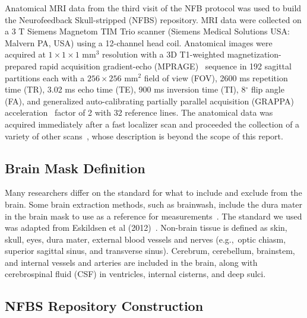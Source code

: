 Anatomical MRI data from the third visit of the NFB protocol was used to build the Neurofeedback Skull-stripped (NFBS) repository. MRI data were collected on a 3 T Siemens Magnetom TIM Trio scanner (Siemens Medical Solutions USA: Malvern PA, USA) using a 12-channel head coil. Anatomical images were acquired at $1\times1\times1$ mm$^3$ resolution with a 3D T1-weighted magnetization-prepared rapid acquisition gradient-echo (MPRAGE)~\cite{Mugler1990} sequence in 192 sagittal partitions each with a $256\times256$ mm$^2$ field of view (FOV), 2600 ms repetition time (TR), 3.02 ms echo time (TE), 900 ms inversion time (TI), 8$^{\circ}$ flip angle (FA), and generalized auto-calibrating partially parallel acquisition (GRAPPA) acceleration~\cite{Griswold2002} factor of 2 with 32 reference lines. The anatomical data was acquired immediately after a fast localizer scan and proceeded the collection of a variety of other scans~\cite{nki_mrproto}, whose description is beyond the scope of this report.

\subsection*{Brain Mask Definition}

\par Many researchers differ on the standard for what to include and exclude from the brain. Some brain extraction methods, such as brainwash, include the dura mater in the brain mask to use as a reference for measurements~\cite{Brainwash}. The standard we used was adapted from Eskildsen et al (2012)~\cite{Eskildsen2012}. Non-brain tissue is defined as skin, skull, eyes, dura mater, external blood vessels and nerves (e.g.,~optic chiasm, superior sagittal sinus, and transverse sinus). Cerebrum, cerebellum, brainstem, and internal vessels and arteries are included in the brain, along with cerebrospinal fluid (CSF) in ventricles, internal cisterns, and deep sulci.

\subsection*{NFBS Repository Construction}

